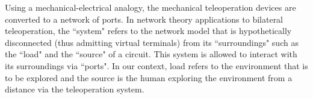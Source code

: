 %
%
%
%
%
%

Using a mechanical-electrical analogy, the mechanical teleoperation devices are converted to a network of ports. In network theory 
applications to bilateral teleoperation, the ``system" refers to the network model that is hypothetically disconnected 
(thus admitting virtual terminals) from its ``surroundings" such as the ``load" and the ``source" of a circuit. This system is 
allowed to interact with its surroundings via ``ports". In our context, load refers to the environment that is to be explored and 
the source is the human exploring the environment from a distance via the teleoperation system.

